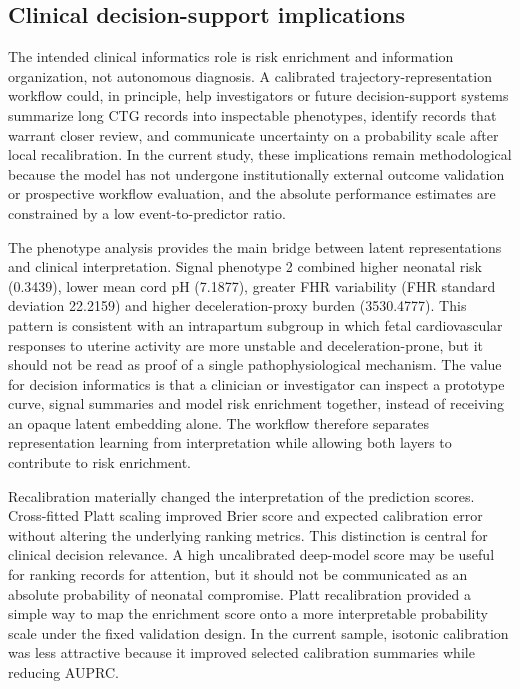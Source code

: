 \documentclass[11pt]{article}
\begin{document}
\subsection{Clinical decision-support implications}

The intended clinical informatics role is risk enrichment and information organization, not autonomous diagnosis. A calibrated trajectory-representation workflow could, in principle, help investigators or future decision-support systems summarize long CTG records into inspectable phenotypes, identify records that warrant closer review, and communicate uncertainty on a probability scale after local recalibration. In the current study, these implications remain methodological because the model has not undergone institutionally external outcome validation or prospective workflow evaluation, and the absolute performance estimates are constrained by a low event-to-predictor ratio.

The phenotype analysis provides the main bridge between latent representations and clinical interpretation. Signal phenotype 2 combined higher neonatal risk (0.3439), lower mean cord pH (7.1877), greater FHR variability (FHR standard deviation 22.2159) and higher deceleration-proxy burden (3530.4777). This pattern is consistent with an intrapartum subgroup in which fetal cardiovascular responses to uterine activity are more unstable and deceleration-prone, but it should not be read as proof of a single pathophysiological mechanism. The value for decision informatics is that a clinician or investigator can inspect a prototype curve, signal summaries and model risk enrichment together, instead of receiving an opaque latent embedding alone. The workflow therefore separates representation learning from interpretation while allowing both layers to contribute to risk enrichment.

Recalibration materially changed the interpretation of the prediction scores. Cross-fitted Platt scaling improved Brier score and expected calibration error without altering the underlying ranking metrics. This distinction is central for clinical decision relevance. A high uncalibrated deep-model score may be useful for ranking records for attention, but it should not be communicated as an absolute probability of neonatal compromise. Platt recalibration provided a simple way to map the enrichment score onto a more interpretable probability scale under the fixed validation design. In the current sample, isotonic calibration was less attractive because it improved selected calibration summaries while reducing AUPRC.
\end{document}
